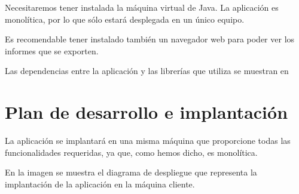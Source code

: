 Necesitaremos tener instalada la máquina virtual de Java. La aplicación es monolítica, por lo que sólo estará desplegada en un único equipo.

Es recomendable tener instalado también un navegador web para poder ver los informes que se exporten.

Las dependencias entre la aplicación y las librerías que utiliza se muestran en 




\section{Plan de desarrollo e implantación}
La aplicación se implantará en una misma máquina que proporcione todas las funcionalidades requeridas, ya que, como hemos dicho, es monolítica.

En la imagen  se muestra el diagrama de despliegue que representa la implantación de la aplicación en la máquina cliente.

